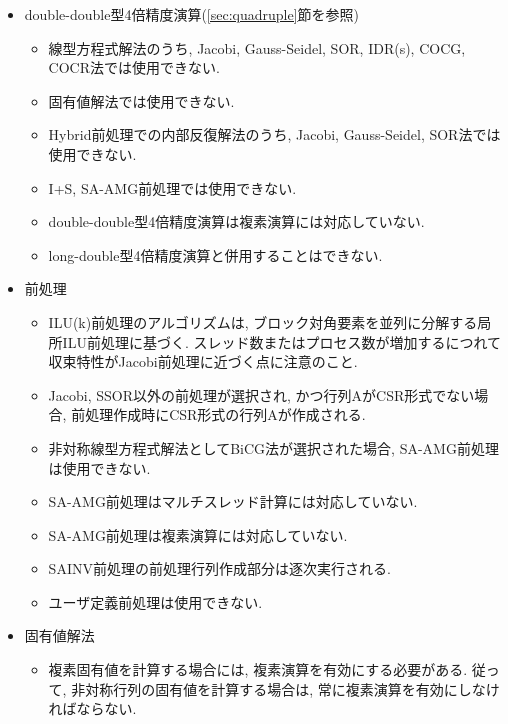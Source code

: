 \documentclass[a4paper]{jarticle}
\begin{document}
{{\begin{itemize}
\item double-double型4倍精度演算(\ref{sec:quadruple}節を参照)
\begin{itemize}
\item 線型方程式解法のうち, Jacobi, Gauss-Seidel, SOR, IDR(s), COCG, COCR法では使用できない.
\item 固有値解法では使用できない.
\item Hybrid前処理での内部反復解法のうち, Jacobi, Gauss-Seidel, SOR法では使用できない.
\item I+S, SA-AMG前処理では使用できない.
\item double-double型4倍精度演算は複素演算には対応していない.
\item long-double型4倍精度演算と併用することはできない.
\end{itemize}

\item 前処理
\begin{itemize}
\item ILU(k)前処理のアルゴリズムは, ブロック対角要素を並列に分解する局所ILU前処理\cite{nakajima}に基づく. スレッド数またはプロセス数が増加するにつれて収束特性がJacobi前処理に近づく点に注意のこと.
\item Jacobi, SSOR以外の前処理が選択され, かつ行列AがCSR形式でない場合,
      前処理作成時にCSR形式の行列Aが作成される.
\item 非対称線型方程式解法としてBiCG法が選択された場合, SA-AMG前処理は使用できない.
\item SA-AMG前処理はマルチスレッド計算には対応していない.
\item SA-AMG前処理は複素演算には対応していない.   
\item SAINV前処理の前処理行列作成部分は逐次実行される.
\item ユーザ定義前処理は使用できない.
\end{itemize}

\item 固有値解法
\begin{itemize}
\item 複素固有値を計算する場合には, 複素演算を有効にする必要がある. 従って, 非対称行列の固有値を計算する場合は, 常に複素演算を有効にしなければならない.
\end{itemize}

\end{itemize}
\vspace*{5mm}

\newpage
}}
\end{document}
